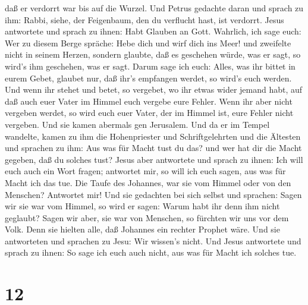 daß er verdorrt war bis auf die Wurzel.  Und Petrus
gedachte daran und sprach zu ihm: Rabbi, siehe, der Feigenbaum, den du
verflucht hast, ist verdorrt.  Jesus antwortete und sprach
zu ihnen: Habt Glauben an Gott.  Wahrlich, ich sage euch:
Wer zu diesem Berge spräche: Hebe dich und wirf dich ins Meer! und
zweifelte nicht in seinem Herzen, sondern glaubte, daß es geschehen
würde, was er sagt, so wird's ihm geschehen, was er sagt. 
Darum sage ich euch: Alles, was ihr bittet in eurem Gebet, glaubet nur,
daß ihr's empfangen werdet, so wird's euch werden.  Und
wenn ihr stehet und betet, so vergebet, wo ihr etwas wider jemand habt,
auf daß auch euer Vater im Himmel euch vergebe eure Fehler.
 Wenn ihr aber nicht vergeben werdet, so wird euch euer
Vater, der im Himmel ist, eure Fehler nicht vergeben.  Und
sie kamen abermals gen Jerusalem. Und da er im Tempel wandelte, kamen zu
ihm die Hohenpriester und Schriftgelehrten und die Ältesten
 und sprachen zu ihm: Aus was für Macht tust du das? und
wer hat dir die Macht gegeben, daß du solches tust?  Jesus
aber antwortete und sprach zu ihnen: Ich will euch auch ein Wort fragen;
antwortet mir, so will ich euch sagen, aus was für Macht ich das tue.
 Die Taufe des Johannes, war sie vom Himmel oder von den
Menschen? Antwortet mir!  Und sie gedachten bei sich selbst
und sprachen: Sagen wir sie war vom Himmel, so wird er sagen: Warum habt
ihr denn ihm nicht geglaubt?  Sagen wir aber, sie war von
Menschen, so fürchten wir uns vor dem Volk. Denn sie hielten alle, daß
Johannes ein rechter Prophet wäre.  Und sie antworteten und
sprachen zu Jesu: Wir wissen's nicht. Und Jesus antwortete und sprach zu
ihnen: So sage ich euch auch nicht, aus was für Macht ich solches tue.

\hypertarget{section-11}{%
\section{12}\label{section-11}}

